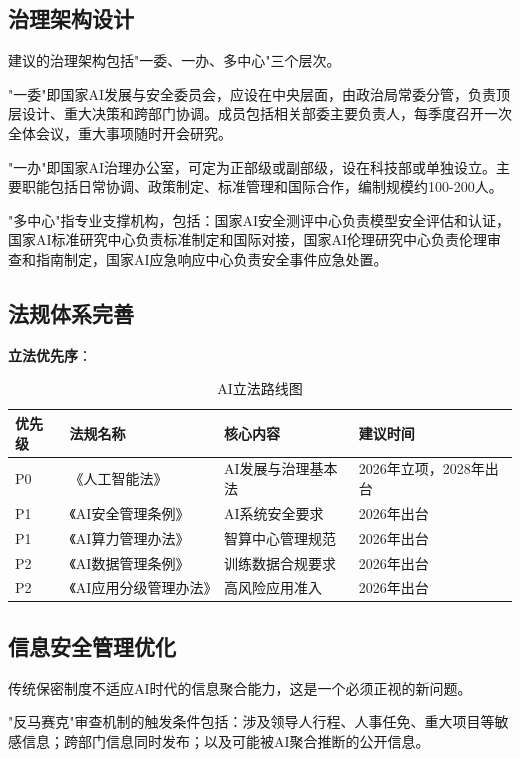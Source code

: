 \subsection{治理架构设计}

建议的治理架构包括"一委、一办、多中心"三个层次。

"一委"即国家AI发展与安全委员会，应设在中央层面，由政治局常委分管，负责顶层设计、重大决策和跨部门协调。成员包括相关部委主要负责人，每季度召开一次全体会议，重大事项随时开会研究。

"一办"即国家AI治理办公室，可定为正部级或副部级，设在科技部或单独设立。主要职能包括日常协调、政策制定、标准管理和国际合作，编制规模约100-200人。

"多中心"指专业支撑机构，包括：国家AI安全测评中心负责模型安全评估和认证，国家AI标准研究中心负责标准制定和国际对接，国家AI伦理研究中心负责伦理审查和指南制定，国家AI应急响应中心负责安全事件应急处置。

\subsection{法规体系完善}

\textbf{立法优先序}：

\begin{table}[H]
\centering
\caption{AI立法路线图}
\small
\begin{tabular}{p{1.5cm}p{3cm}p{4cm}p{3.5cm}}
\toprule
\textbf{优先级} & \textbf{法规名称} & \textbf{核心内容} & \textbf{建议时间} \\
\midrule
P0 & 《人工智能法》 & AI发展与治理基本法 & 2026年立项，2028年出台 \\
P1 & 《AI安全管理条例》 & AI系统安全要求 & 2026年出台 \\
P1 & 《AI算力管理办法》 & 智算中心管理规范 & 2026年出台 \\
P2 & 《AI数据管理条例》 & 训练数据合规要求 & 2026年出台 \\
P2 & 《AI应用分级管理办法》 & 高风险应用准入 & 2026年出台 \\
\bottomrule
\end{tabular}
\end{table}

\subsection{信息安全管理优化}

传统保密制度不适应AI时代的信息聚合能力，这是一个必须正视的新问题。

"反马赛克"审查机制的触发条件包括：涉及领导人行程、人事任免、重大项目等敏感信息；跨部门信息同时发布；以及可能被AI聚合推断的公开信息。

